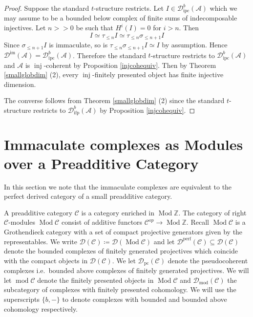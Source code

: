 \documentclass[12pt,oneside]{amsart}
\DeclareMathOperator{\Mod}{Mod}
\DeclareMathOperator{\fdmod}{mod}
\DeclareMathOperator{\perf}{perf}
\DeclareMathOperator{\inj}{inj}
\DeclareMathOperator{\immac}{im}
\DeclareMathOperator{\ipscoh}{ipc}
\DeclareMathOperator{\ifp}{ifp}
\DeclareMathOperator{\pc}{pc}
\begin{document}
\begin{proof}
Suppose the standard $t$-structure restricts. Let $I \in \mathcal{D}^b_{\ipscoh}(\mathcal{A})$ which we may assume to be a bounded below complex of finite sums of indecomposable injectives. Let $n >> 0$ be such that $H^i(I) = 0$ for $i > n$. Then 
\[
I \simeq \tau_{\leq n} I \simeq \tau_{\leq n} \sigma_{\leq n+1} I
\]
Since $\sigma_{\leq n+1} I$ is immaculate, so is $\tau_{\leq n} \sigma_{\leq n+1} I \simeq I$ by assumption. Hence $\mathcal{D}^{\immac}(\mathcal{A}) = \mathcal{D}^b_{\ipscoh}(\mathcal{A})$. Therefore the standard $t$-structure restricts to $\mathcal{D}^b_{\ipscoh}(\mathcal{A})$ and $\mathcal{A}$ is $\inj$-coherent by Proposition \ref{injcohequiv}. Then by Theorem \ref{smallglobdim} (2), every $\inj$-finitely presented object has finite injective dimension. 

The converse follows from Theorem \ref{smallglobdim} (2) since the standard $t$-structure restricts to $\mathcal{D}^b_{\ifp}(\mathcal{A})$ by Proposition \ref{injcohequiv}.
\end{proof}





\section{Immaculate complexes as Modules over a Preadditive Category}
\label{preadditivesec}

In this section we note that the immaculate complexes are equivalent to the perfect derived category of a small preadditive category.

A preadditive category $\mathcal{C}$ is a category enriched in $\Mod \mathbb{Z}$. The category of right $\mathcal{C}$-modules $\Mod \mathcal{C}$ consist of additive functors $\mathcal{C}^{op} \to \Mod \mathbb{Z}$. Recall $\Mod \mathcal{C}$ is a Grothendieck category with a set of compact projective generators given by the representables. We write $\mathcal{D}(\mathcal{C}) \coloneq \mathcal{D}(\Mod \mathcal{C})$ and let $\mathcal{D}^{\perf}(\mathcal{C}) \subseteq \mathcal{D}(\mathcal{C})$ denote the bounded complexes of finitely generated projectives which coincide with the compact objects in $\mathcal{D}(\mathcal{C})$. We let $\mathcal{D}_{\pc}(\mathcal{C})$ denote the pseudocoherent complexes i.e.\ bounded above complexes of finitely generated projectives. We will let $\fdmod \mathcal{C}$ denote the finitely presented objects in $\Mod \mathcal{C}$ and $\mathcal{D}_{\fdmod}(\mathcal{C})$ the subcategory of complexes with finitely presented cohomology. We will use the superscripts $\{b,-\}$ to denote complexes with bounded and bounded above cohomology respectively.
\\
\end{document}
